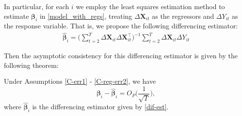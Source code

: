 \documentclass[a4paper,12pt]{article}
\begin{document}
In particular, for each $i$ we employ the least squares estimation method to estimate $\bm{\beta}_i$ in \eqref{model_with_regs}, treating $\Delta \mathbf{X}_{it}$ as the regressors and $\Delta Y_{it}$ as the response variable. That is, we propose the following differencing estimator:
\begin{align}\label{dif-est}
\widehat{\bm{\beta}}_i = \Big( \sum_{t=2}^T \Delta \mathbf{X}_{it} \Delta \mathbf{X}_{it}^\top \Big)^{-1} \sum_{t=2}^T \Delta \mathbf{X}_{it} \Delta Y_{it}
\end{align}

Then the asymptotic consistency for this differencing estimator is given by the following theorem:

\begin{theorem}\label{theo-regs}
Under Assumptions \ref{C-err1} - \ref{C-reg-err2}, we have
\[\bm{\beta}_i - \widehat{\bm{\beta}}_i  = O_P \Big(\frac{1}{\sqrt{T}}\Big),
\]
where $\widehat{\bm{\beta}}_i$ is the differencing estimator given by \eqref{dif-est}.
\end{theorem}


\end{document}
